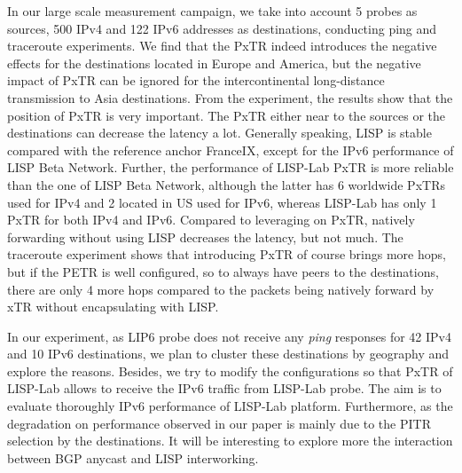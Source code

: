 In our large scale measurement campaign, we take into account 5 probes as sources, 500 IPv4 and 122 IPv6 addresses as destinations, conducting ping and traceroute experiments. We find that the PxTR indeed introduces the negative effects for the destinations located in Europe and America, but the negative impact of PxTR can be ignored for the intercontinental long-distance transmission to Asia destinations. From the experiment, the results show that the position of PxTR is very important. The PxTR either near to the sources or the destinations can decrease the latency a lot. Generally speaking, LISP is stable compared with the reference anchor FranceIX, except for the IPv6 performance of LISP Beta Network. Further, the performance of LISP-Lab PxTR is more reliable than the one of LISP Beta Network, although the latter has 6 worldwide PxTRs used for IPv4 and 2 located in US used for IPv6, whereas LISP-Lab has only 1 PxTR for both IPv4 and IPv6. Compared to leveraging on PxTR, natively forwarding without using LISP decreases the latency, but not much. The traceroute experiment shows that introducing PxTR of course brings more hops, but if the PETR is well configured, so to always have peers to the destinations, there are only 4 more hops compared to the packets being natively forward by xTR without encapsulating with LISP.

In our experiment, as LIP6 probe does not receive any \emph{ping} responses for 42 IPv4 and 10 IPv6 destinations, we plan to cluster these destinations by geography and explore the reasons. Besides, we try to modify the configurations so that PxTR of LISP-Lab allows to receive the IPv6 traffic from LISP-Lab probe. The aim is to evaluate thoroughly IPv6 performance of LISP-Lab platform. Furthermore, as the degradation on performance observed in our paper is mainly due to the PITR selection by the destinations. It will be interesting to explore more the interaction between BGP anycast and LISP interworking. 